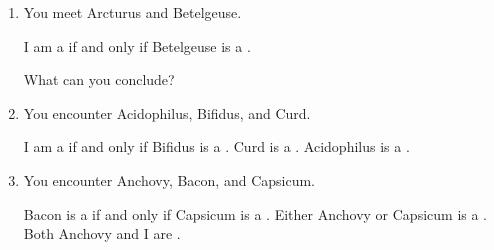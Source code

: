 \probsec{~\ref{sec:biconditionals}}
\begin{enumerate}
    \item You meet Arcturus and Betelgeuse.
  \begin{dialogue}
     I am a \knight if and only if Betelgeuse is a \knight.
  \end{dialogue}
  What can you conclude?

    \item You encounter Acidophilus, Bifidus, and Curd.
  \begin{dialogue}
     I am a \knave if and only if Bifidus is a \knight.
     Curd is a \knave.
     Acidophilus is a \knight.
  \end{dialogue}

    \item You encounter Anchovy, Bacon, and Capsicum.
  \begin{dialogue}
     Bacon is a \knight if and only if Capsicum is a \knight.
     Either Anchovy or Capsicum is a \knave.
     Both Anchovy and I are \knights.
  \end{dialogue}

\end{enumerate}
